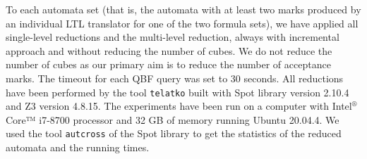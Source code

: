 \documentclass[a4paper,UKenglish,cleveref,autoref,thm-restate]{lipics-v2021}
\newcommand{\todo}[1]{\marginpar{\textcolor{red}{#1}}}
\begin{document}
To each automata set (that is, the automata with at least two marks
produced by an individual LTL translator for one of the two formula
sets), we have applied all single-level reductions and the multi-level
reduction, always with incremental approach and without reducing the
number of cubes. We do not reduce the number of cubes as our primary
aim is to reduce the number of acceptance marks.
The timeout for each QBF query was set to 30 seconds.
%
All reductions have been performed by the tool \texttt{telatko}
built with Spot library version 2.10.4 and Z3 version 4.8.15. The
experiments have been run on a computer with Intel$^\text{®}$ Core™ i7-8700
processor and 32 GB of memory running Ubuntu 20.04.4. We used the tool
\texttt{autcross} of the Spot library to get the statistics of the
reduced automata and the running times.
\end{document}
